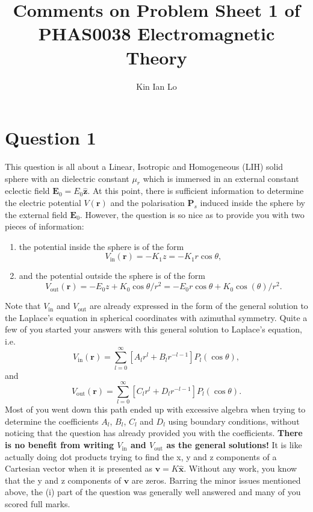 \documentclass[a4paper]{article}
\title{Comments on Problem Sheet 1 of PHAS0038 Electromagnetic Theory}
\author{Kin Ian Lo}
\begin{document}
\maketitle
\section{Question 1}
\label{sec:question_1}
This question is all about a Linear, Isotropic and Homogeneous (LIH) solid sphere with an dielectric constant $\mu_r$ which is immersed in an external constant eclectic field $\mathbf{E}_0 = E_0 \mathbf{\hat{z}}$. 
At this point, there is sufficient information to determine the electric potential $V(\mathbf{r})$ and the polarisation $\mathbf{P}_s$ induced inside the sphere by the external field $\mathbf{E}_0$.
However, the question is so nice as to provide you with two pieces of information:
\begin{enumerate}
    \item the potential inside the sphere is of the form 
        \[
            V_\text{in}(\mathbf{r}) = - K_1 z = - K_1 r \cos\theta
        ,\] 
    \item and the potential outside the sphere is of the form 
        \[
            V_\text{out}(\mathbf{r}) = - E_0 z + K_0 \cos\theta/r^2 = -E_0 r \cos\theta + K_0 \cos(\theta)/r^2
        .\] 
\end{enumerate}
Note that $V_\text{in}$ and $V_\text{out}$ are already expressed in the form of the general solution to the Laplace's equation in spherical coordinates with azimuthal symmetry. Quite a few of you started your answers with this general solution to Laplace's equation, i.e.
\[
    V_\text{in}(\mathbf{r}) = \sum_{l=0}^\infty \left[ A_l r^l + B_l r^{-l-1} \right] P_l(\cos\theta)
,\] and
\[
    V_\text{out}(\mathbf{r}) = \sum_{l=0}^\infty \left[ C_l r^l + D_l r^{-l-1} \right] P_l(\cos\theta)
.\] 
Most of you went down this path ended up with excessive algebra when trying to determine the coefficients $A_l$, $B_l$, $C_l$ and $D_l$ using boundary conditions, without noticing that the question has already provided you with the coefficients.
\textbf{There is no benefit from writing $V_\text{in}$ and $V_\text{out}$ as the general solutions!}
It is like actually doing dot products trying to find the x, y and z components of a Cartesian vector when it is presented as  $\mathbf{v} = K \mathbf{\hat{x}}$.
Without any work, you know that the y and z components of $\mathbf{v}$ are zeros. 
Barring the minor issues mentioned above, the (i) part of the question was generally well answered and many of you scored full marks.
\end{document}
